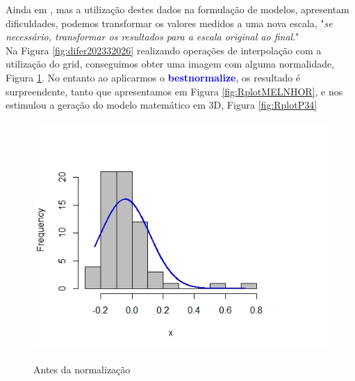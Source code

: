 %
  \hspace*{1.25 cm}  Ainda em \cite[p.20]{Webster}, mas a utilização destes dados na formulação de modelos, apresentam dificuldades, podemos transformar os valores medidos a uma nova escala, "\textit{se necessário, transformar os resultados para a escala original ao final}." \\
\hspace*{1.25 cm}  Na Figura \ref{fig:difer202332026} realizando operações de interpolação com a utilização do grid, conseguimos obter uma imagem com alguma normalidade, Figura \ref{fig:RplotN16}. No entanto ao aplicarmos o \textbf{\textcolor{blue}{bestnormalize}}, os resultado é surpreendente, tanto que apresentamos em Figura \ref{fig:RplotMELNHOR}, e nos estimulou a geração do modelo matemático em 3D, Figura \ref{fig:RplotP34}\\
 			\begin{minipage}[t!]{0.31\textwidth}
 				\begin{figure}[H]
 					\centering \small \caption{Antes da normalização}
 					\includegraphics[width=0.97\linewidth]{FIGURAS/RplotN1}
 					\label{fig:RplotN16}
 				\end{figure}			
 				
 			\end{minipage}\hfill

